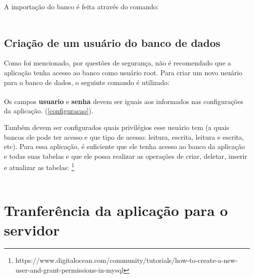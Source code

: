 \documentclass[11pt,a4paper]{report}
\begin{document}

A importação do banco é feita através do comando:\\

\\

\subsection{Criação de um usuário do banco de dados}

Como foi mencionado, por questões de segurança, não é recomendado que a aplicação tenha acesso ao banco como usuário root. Para criar um novo usuário para o banco de dados, o seguinte comando é utilizado:\\

\\

Os campos \textbf{usuario} e \textbf{senha} devem ser iguais aos informados nas configurações da aplicação. (\ref{configuracao}).

Também devem ser configurados quais privilégios esse usuário tem (a quais bancos ele pode ter acesso e que tipo de acesso: leitura, escrita, leitura e escrita, etc). Para essa aplicação, é suficiente que ele tenha acesso ao banco da aplicação e todas suas tabelas e que ele possa realizar as operações de criar, deletar, inserir e atualizar as tabelas: \footnote{https://www.digitalocean.com/community/tutorials/how-to-create-a-new-user-and-grant-permissions-in-mysql} \\

\\


\section{Tranferência da aplicação para o servidor}
\end{document}
